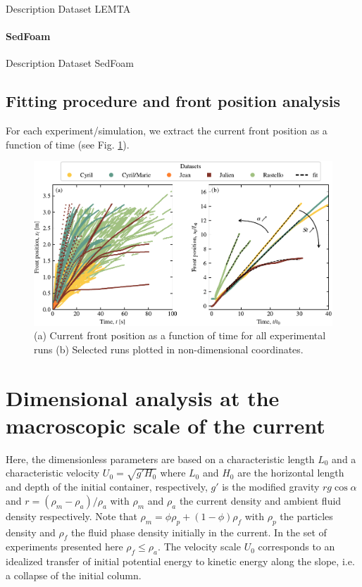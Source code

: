 \documentclass[twocolumn]{article}
\begin{document}
Description Dataset LEMTA

\paragraph{SedFoam}

Description Dataset SedFoam

\subsection{Fitting procedure and front position analysis}

For each experiment/simulation, we extract the current front position as a function of time (see Fig. \ref{fig:fig3}).



\begin{figure}
	\centering
	\includegraphics{figure3.pdf}
	\caption{(a) Current front position as a function of time for all experimental runs (b) Selected runs plotted in non-dimensional coordinates.}
	\label{fig:fig3}
\end{figure}

\section{Dimensional analysis at the macroscopic scale of the current}
\label{sec:dimensionlessmap}

Here, the dimensionless parameters are based on a characteristic length $L_0$ and a characteristic velocity $U_0=\sqrt{g' H_0}$ where $L_0$ and $H_0$ are the horizontal length and depth of the initial container, respectively, $g'$ is the modified gravity $r g \cos{\alpha}$ and $r = (\rho_m - \rho_a)/\rho_a$ with $\rho_m$ and $\rho_a$ the current density and ambient fluid density respectively. Note that $\rho_m = \phi \rho_p+(1-\phi)\rho_f$ with $\rho_p$ the particles density and $\rho_f$ the fluid phase density initially in the current. In the set of experiments presented here $\rho_f\le \rho_a$. The velocity scale $U_0$ corresponds to an idealized transfer of initial potential energy to kinetic energy along the slope, i.e. a collapse of the initial column.
\end{document}

